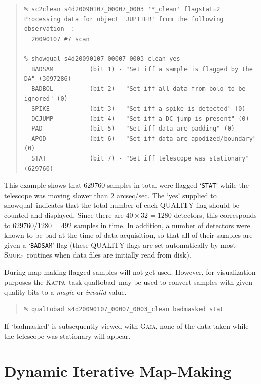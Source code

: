 \documentclass[twoside,11pt]{article}
\newenvironment{myquote}{\begin{quote}\begin{small}}{\end{small}\end{quote}}
\newcommand{\Kappa}{\xref{\textsc{Kappa}}{sun95}{}}
\newcommand{\gaia}{\xref{\textsc{Gaia}}{sun214}{}}
\newcommand{\smurf}{\xref{\textsc{Smurf}}{sun258}{}}
\newcommand{\task}[1]{\textsf{#1}}
\newcommand{\qualtobad}{\xref{\task{qualtobad}}{sun95}{QUALTOBAD}}
\newcommand{\showqual}{\xref{\task{showqual}}{sun95}{SHOWQUAL}}
\newcommand{\xref}[3]{#1}
\newcommand{\xlabel}[1]{}
\renewcommand{\_}{\texttt{\symbol{95}}}
\begin{document}
\begin{myquote}
\begin{verbatim}
% sc2clean s4d20090107_00007_0003 '*_clean' flagstat=2
Processing data for object 'JUPITER' from the following observation  :
  20090107 #7 scan

% showqual s4d20090107_00007_0003_clean yes
  BADSAM          (bit 1) - "Set iff a sample is flagged by the DA" (3097286)
  BADBOL          (bit 2) - "Set iff all data from bolo to be ignored" (0)
  SPIKE           (bit 3) - "Set iff a spike is detected" (0)
  DCJUMP          (bit 4) - "Set iff a DC jump is present" (0)
  PAD             (bit 5) - "Set iff data are padding" (0)
  APOD            (bit 6) - "Set iff data are apodized/boundary" (0)
  STAT            (bit 7) - "Set iff telescope was stationary" (629760)
\end{verbatim}
\end{myquote}

This example shows that 629760 samples in total were flagged
`\texttt{STAT}' while the telescope was moving slower than 2
arcsec/sec. The `yes' supplied to \showqual\ indicates that the total
number of each QUALITY flag should be counted and displayed. Since
there are $40\times32=1280$ detectors, this corresponds to
$629760/1280=492$ samples in time. In addition, a number of detectors
were known to be bad at the time of data acquisition, so that all of
their samples are given a `\texttt{BADSAM}' flag (these QUALITY flags
are set automatically by most \smurf\ routines when data files are
initially read from disk).

During map-making flagged samples will not get used. However, for
visualization purposes the \Kappa\ task \qualtobad\ may be used to
convert samples with given quality bits to a {\em magic\/} or {\em
  invalid\/} value.

\begin{myquote}
\begin{verbatim}
% qualtobad s4d20090107_00007_0003_clean badmasked stat
\end{verbatim}
\end{myquote}

If `badmasked' is subsequently viewed with \gaia, none of the data
taken while the telescope was stationary will appear.

\section{\xlabel{maps}Dynamic Iterative Map-Making} 
\label{sec:maps}
\end{document}
